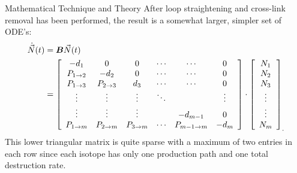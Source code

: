 \begin{chapter}{Mathematical Technique and Theory}
After loop straightening and cross-link removal has been performed,
the result is a somewhat larger, simpler set of ODE's:
\begin{equation}
  \begin{split}
    \dot{\vec{N}}(t) &= \mbox{\boldmath $B$}\vec{N}(t)\\
    &= \left [
      \begin{array}{cccccc}
        -d_1 & 0 & 0 & \cdots & \cdots & 0 \\
        P_{1\rightarrow 2} & -d_2 & 0 & \cdots & \cdots & 0\\
        P_{1\rightarrow 3} & P_{2\rightarrow 3} & d_3 & \cdots & \cdots & 0 \\
        \vdots & \vdots & \vdots & \ddots &  & \vdots\\
        \vdots & \vdots & \vdots & & -d_{m-1} & 0\\
        P_{1\rightarrow m} & P_{2\rightarrow m} & P_{3\rightarrow m} & \cdots & P_{m-1\rightarrow m} & -d_m
      \end{array} \right ] \cdot \left [
      \begin{array}{c}
        N_1 \\ N_2 \\ N_3 \\ \vdots \\ \vdots \\ N_m
      \end{array} \right ]_.\label{eq:math.intro.tree}
  \end{split}
\end{equation}
This lower triangular matrix is quite sparse with a maximum of two
entries in each row since each isotope has only one production path
and one total destruction rate.


\end{chapter}
